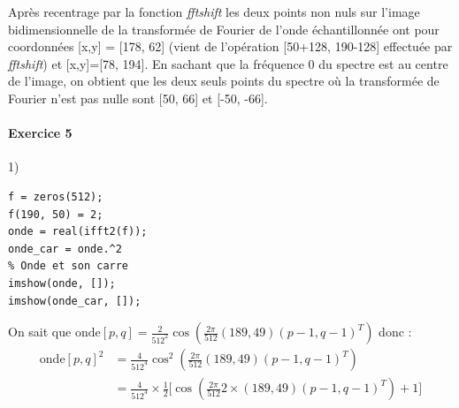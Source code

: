 \documentclass[a4paper, 11pt]{article}
\begin{document}
Après recentrage par la fonction \textit{fftshift} les deux points non nuls sur l'image bidimensionnelle de la
transformée de Fourier de l'onde échantillonnée ont pour coordonnées [x,y] = [178, 62] (vient de l'opération 
[50+128, 190-128] effectuée par \textit{fftshift}) et [x,y]=[78, 194]. En sachant que la fréquence 0 du spectre est au
centre de l'image, on obtient que les deux seuls points du spectre où la transformée de Fourier n'est pas nulle sont 
[50, 66] et [-50, -66].

\paragraph{Exercice 5}

1)
\begin{lstlisting}[frame=single]
f = zeros(512);
f(190, 50) = 2;
onde = real(ifft2(f));
onde_car = onde.^2
% Onde et son carre
imshow(onde, []);
imshow(onde_car, []);
\end{lstlisting}

\begin{figure}[!h]
\centering
{}%
\qquad
{}%
\end{figure}

On sait que $\text{onde}[p,q] = \frac{2}{512^2}\cos(\frac{2\pi}{512}(189, 49)(p-1,q-1)^T)$ donc : 
\begin{align}
\text{onde}[p,q]^2 &= \frac{4}{512^4}\cos^2(\frac{2\pi}{512}(189, 49)(p-1,q-1)^T)\\
&=\frac{4}{512^4} \times \frac{1}{2}\big[\cos(\frac{2\pi}{512}2\times(189, 49)(p-1,q-1)^T) + 1\big]
\end{align}
\end{document}
